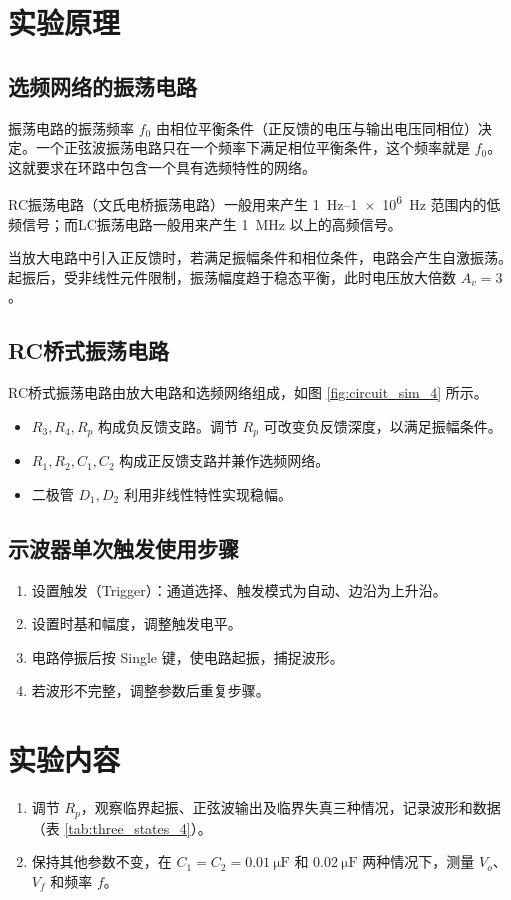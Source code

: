 \documentclass[UTF8, a4paper]{ctexrep} %
\begin{document}
\section{实验原理} \label{subsec:principle_4}

\subsection{选频网络的振荡电路}
振荡电路的振荡频率 $f_0$ 由相位平衡条件（正反馈的电压与输出电压同相位）决定。一个正弦波振荡电路只在一个频率下满足相位平衡条件，这个频率就是 $f_0$。这就要求在环路中包含一个具有选频特性的网络。

RC振荡电路（文氏电桥振荡电路）一般用来产生 \qtyrange{1}{1e6}{\Hz} 范围内的低频信号；而LC振荡电路一般用来产生 \qty{1}{\MHz} 以上的高频信号。

当放大电路中引入正反馈时，若满足振幅条件和相位条件，电路会产生自激振荡。起振后，受非线性元件限制，振荡幅度趋于稳态平衡，此时电压放大倍数 $A_v = 3$。

\subsection{RC桥式振荡电路}
RC桥式振荡电路由放大电路和选频网络组成，如图 \ref{fig:circuit_sim_4} 所示。
\begin{itemize}
    \item $R_3, R_4, R_p$ 构成负反馈支路。调节 $R_p$ 可改变负反馈深度，以满足振幅条件。
    \item $R_1, R_2, C_1, C_2$ 构成正反馈支路并兼作选频网络。
    \item 二极管 $D_1, D_2$ 利用非线性特性实现稳幅。
\end{itemize}

\subsection{示波器单次触发使用步骤}
\begin{enumerate}
    \item 设置触发（Trigger）：通道选择、触发模式为自动、边沿为上升沿。
    \item 设置时基和幅度，调整触发电平。
    \item 电路停振后按 Single 键，使电路起振，捕捉波形。
    \item 若波形不完整，调整参数后重复步骤。
\end{enumerate}

\section{实验内容} \label{subsec:content_4}
\begin{enumerate}
    \item 调节 $R_p$，观察临界起振、正弦波输出及临界失真三种情况，记录波形和数据（表 \ref{tab:three_states_4}）。
    \item 保持其他参数不变，在 $C_1 = C_2 = \qty{0.01}{\micro\farad}$ 和 $\qty{0.02}{\micro\farad}$ 两种情况下，测量 $V_o$、$V_f$ 和频率 $f$。
\end{enumerate}
\end{document}
